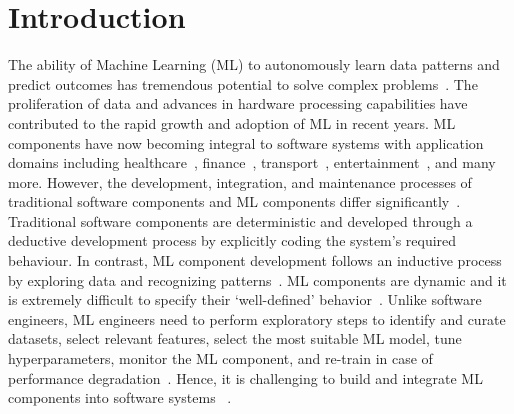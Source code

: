 \section{Introduction}\label{sec:introduction}

The ability of Machine Learning (ML) to autonomously learn data patterns and predict outcomes has tremendous potential to solve complex problems~\cite{zhang2003machine}. The proliferation of data and advances in hardware processing capabilities have contributed to the rapid growth and adoption of ML in recent years. ML components have now becoming integral to software systems with application domains including healthcare~\cite{ghassemi2020review,beam2018big}, finance~\cite{goodell2021artificial,dixon2020machine}, transport~\cite{zantalis2019review}, entertainment~\cite{galway2008machine, bennett2007netflix}, and many more. However, the development, integration, and maintenance processes of traditional software components and ML components  differ significantly~\cite{ahmad2023requirements}. Traditional software components are deterministic and developed through a {deductive} development process by explicitly coding the system's required behaviour. In contrast, ML component development follows an {inductive} process by exploring data and recognizing patterns~\cite{khomh2018software}. ML components are dynamic and it is extremely difficult to specify their `well-defined' behavior~\cite{ahmad2023requirements,arora2023advancing}. Unlike software engineers, ML engineers need to perform exploratory steps to identify and curate datasets, select relevant features, select the most suitable ML model, tune hyperparameters, monitor the ML component, and re-train in case of performance degradation~\cite{lwakatare2019taxonomy}. Hence, it is challenging to build and integrate ML components into software systems ~\cite{khomh2018software}. 

